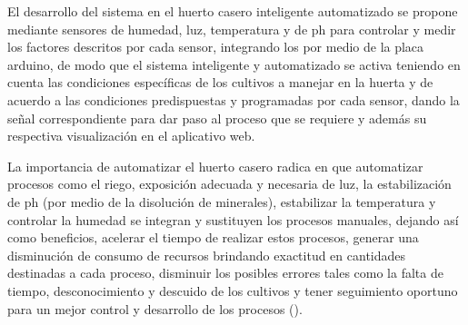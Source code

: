\noindent El desarrollo del sistema en el huerto casero inteligente
automatizado se propone mediante sensores de humedad, luz, temperatura y de ph
para controlar y medir los factores descritos por cada sensor, integrando los
por medio de la placa arduino, de modo que el sistema inteligente y
automatizado se activa teniendo en cuenta las condiciones específicas de los
cultivos a manejar en la huerta y de acuerdo a las condiciones predispuestas y
programadas por cada sensor, dando la señal correspondiente para dar paso al
proceso que se requiere y además su respectiva visualización en el aplicativo
web.

\noindent La importancia de automatizar el huerto casero radica en que
automatizar procesos como el riego, exposición adecuada y necesaria de luz, la
estabilización de ph (por medio de la disolución de minerales), estabilizar la
temperatura y controlar la humedad se integran y sustituyen los procesos
manuales, dejando así como beneficios, acelerar el tiempo de realizar estos
procesos, generar una disminución de consumo de recursos brindando exactitud en
cantidades destinadas a cada proceso, disminuir los posibles errores tales como
la falta de tiempo, desconocimiento y descuido de los cultivos y tener
seguimiento oportuno para un mejor control y desarrollo de los procesos (\cite{ricopia2018}).
